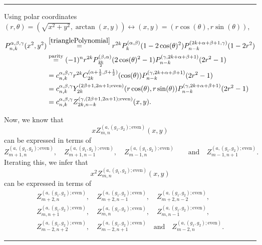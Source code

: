 \documentclass{article}
\numberwithin{equation}{section}
\numberwithin{figure}{section}
\begin{document}
\noindent\rule{\linewidth}{2pt}

Using polar coordinates $(r,\theta) = \left(\sqrt{x^2+y^2},\arctan(x,y)\right) \leftrightarrow (x,y) = \left(r\cos(\theta),r\sin(\theta)\right)$,
%
\begin{equation*}
\begin{split}
P^{\alpha,\beta,\gamma}_{n,k}(x^2,y^2)
& \stackrel{\eqref{trianglePolynomial}}{=} r^{2k} P^{(\alpha,\beta)}_k(1-2\cos(\theta)^2) P^{(2k+\alpha+\beta+1,\gamma)}_{n-k}(1-2r^2)\\
& \stackrel{\text{parity}}{=} (-1)^n r^{2k} P^{(\beta,\alpha)}_{\frac{2k}{2}}(2\cos(\theta)^2-1) P^{(\gamma,2k+\alpha+\beta+1)}_{n-k}(2r^2-1)\\
& = c^{\alpha,\beta,\gamma}_{n,k} r^{2k} C^{(\alpha+\frac{1}{2},\beta+\frac{1}{2})}_{2k}(\cos(\theta)) P^{(\gamma,2k+\alpha+\beta+1)}_{n-k}(2r^2-1)\\
& = c^{\alpha,\beta,\gamma}_{n,k} Y^{(2\beta+1,2\alpha+1;\textrm{even})}_{2k}(r\cos(\theta),r\sin(\theta)) P^{(\gamma,2k+\alpha+\beta+1)}_{n-k}(2r^2-1)\\
& = c^{\alpha,\beta,\gamma}_{n,k} Z^{(\gamma,(2\beta+1,2\alpha+1);\textrm{even})}_{2k,n-k}(x,y).
\end{split}
\end{equation*}
%

Now, we know that
%
\begin{equation*}
x Z^{(a,(g_1,g_2);\mathrm{even})}_{m,n}(x,y)
\end{equation*}
%
can be expressed in terms of
%
\begin{equation*}
Z^{(a,(g_1,g_2);\mathrm{even})}_{m+1,n}, \quad
Z^{(a,(g_1,g_2);\mathrm{even})}_{m+1,n-1}, \quad
Z^{(a,(g_1,g_2);\mathrm{even})}_{m-1,n} \quad
\quad \text{and} \quad
Z^{(a,(g_1,g_2);\mathrm{even})}_{m-1,n+1}.
\end{equation*}
%
Iterating this, we infer that
%
\begin{equation*}
x^2 Z^{(a,(g_1,g_2);\mathrm{even})}_{m,n}(x,y)
\end{equation*}
%
can be expressed in terms of
%
\begin{equation*}
\begin{gathered}
Z^{(a,(g_1,g_2);\mathrm{even})}_{m+2,n}, \quad
Z^{(a,(g_1,g_2);\mathrm{even})}_{m+2,n-1}, \quad
Z^{(a,(g_1,g_2);\mathrm{even})}_{m+2,n-2},\\
Z^{(a,(g_1,g_2);\mathrm{even})}_{m,n+1}, \quad
Z^{(a,(g_1,g_2);\mathrm{even})}_{m,n}, \quad
Z^{(a,(g_1,g_2);\mathrm{even})}_{m,n-1},\\
Z^{(a,(g_1,g_2);\mathrm{even})}_{m-2,n+2}, \quad
Z^{(a,(g_1,g_2);\mathrm{even})}_{m-2,n+1} \quad\text{and}\quad
Z^{(a,(g_1,g_2);\mathrm{even})}_{m-2,n}.
\end{gathered}
\end{equation*}
%

\noindent\rule{\linewidth}{2pt}





\end{document}
